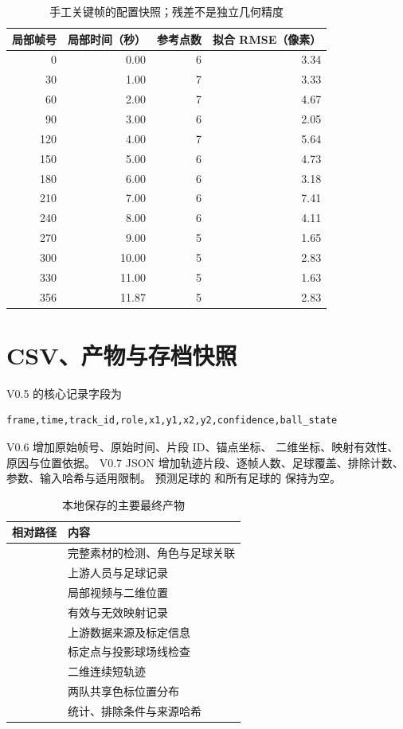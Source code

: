 \documentclass[UTF8,fontset=fandol,11pt,a4paper]{ctexart}
\newcommand{\code}[1]{\texttt{\detokenize{#1}}}
\begin{document}
\begin{table}[htbp]
\centering
\caption{手工关键帧的配置快照；残差不是独立几何精度}
\small
\begin{tabular}{rrrr}
\toprule
局部帧号 & 局部时间（秒） & 参考点数 & 拟合 RMSE（像素）\\
\midrule
0   & 0.00  & 6 & 3.34\\
30  & 1.00  & 7 & 3.33\\
60  & 2.00  & 7 & 4.67\\
90  & 3.00  & 6 & 2.05\\
120 & 4.00  & 7 & 5.64\\
150 & 5.00  & 6 & 4.73\\
180 & 6.00  & 6 & 3.18\\
210 & 7.00  & 6 & 7.41\\
240 & 8.00  & 6 & 4.11\\
270 & 9.00  & 5 & 1.65\\
300 & 10.00 & 5 & 2.83\\
330 & 11.00 & 5 & 1.63\\
356 & 11.87 & 5 & 2.83\\
\bottomrule
\end{tabular}
\end{table}

\section{CSV、产物与存档快照}

V0.5 的核心记录字段为
\begin{lstlisting}
frame,time,track_id,role,x1,y1,x2,y2,confidence,ball_state
\end{lstlisting}
V0.6 增加原始帧号、原始时间、片段 ID、锚点坐标、
二维坐标、映射有效性、原因与位置依据。
V0.7 JSON 增加轨迹片段、逐帧人数、足球覆盖、排除计数、
参数、输入哈希与适用限制。
预测足球的 \code{confidence} 和所有足球的 \code{track_id} 保持为空。

\begin{table}[htbp]
\centering
\caption{本地保存的主要最终产物}
\small
\begin{tabularx}{\linewidth}{@{}LL@{}}
\toprule
相对路径 & 内容\\
\midrule
{} & 完整素材的检测、角色与足球关联\\
 & 上游人员与足球记录\\
 & 局部视频与二维位置\\
 & 有效与无效映射记录\\
 & 上游数据来源及标定信息\\
 & 标定点与投影球场线检查\\
 & 二维连续短轨迹\\
 & 两队共享色标位置分布\\
 & 统计、排除条件与来源哈希\\
\bottomrule
\end{tabularx}
\end{table}
\end{document}
